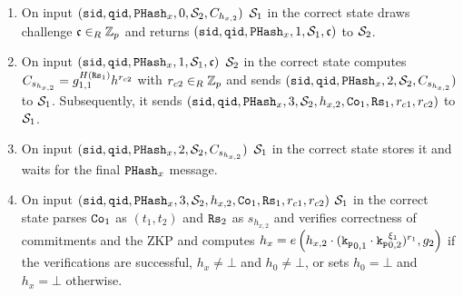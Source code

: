 \begin{enumerate}
    
	    \item On input $(\mathtt{sid},\mathtt{qid},\mathtt{PHash}_x,0,\mathcal{S}_2,C_{h_{x,2}})$ $\mathcal{S}_1$ in the correct state draws challenge $\mathfrak{c}\in_R\mathbb{Z}_p$ and returns $(\mathtt{sid},\mathtt{qid},\mathtt{PHash}_x,1,\mathcal{S}_1,\mathfrak{c})$ to $\mathcal{S}_2$.
	    
	    \item On input $(\mathtt{sid},\mathtt{qid},\mathtt{PHash}_x,1,\mathcal{S}_1,\mathfrak{c})$ $\mathcal{S}_2$ in the correct state computes
	    $C_{s_{h_{x,2}}}=g_{1,1}^{H(\mathtt{Rs}_{1})} h^{r_{c2}}$ with $r_{c2}\in_R\mathbb{Z}_p$
	    and sends $(\mathtt{sid},\mathtt{qid},\mathtt{PHash}_x,2,\mathcal{S}_2,C_{s_{h_{x,2}}})$ to $\mathcal{S}_1$.
	    Subsequently, it sends $(\mathtt{sid},\mathtt{qid},\mathtt{PHash}_x,3,\mathcal{S}_2,h_{x,2}, \mathtt{Co}_1, \mathtt{Rs}_1, r_{c1}, r_{c2})$ to $\mathcal{S}_1$.
	    
	    \item On input $(\mathtt{sid},\mathtt{qid},\mathtt{PHash}_x,2,\mathcal{S}_2,C_{s_{h_{x,2}}})$ $\mathcal{S}_1$ in the correct state stores it and waits for the final $\mathtt{PHash}_x$ message.
	    
	    \item On input $(\mathtt{sid},\mathtt{qid},\mathtt{PHash}_x,3,\mathcal{S}_2,h_{x,2}, \mathtt{Co}_1, \mathtt{Rs}_1, r_{c1}, r_{c2})$ $\mathcal{S}_1$ in the correct state parses $\mathtt{Co}_1$ as $(t_1,t_2)$ and $\mathtt{Rs}_2$ as $s_{h_{x,2}}$ and verifies correctness of commitments and the \ac{ZKP}
	     and computes
 	    $h_x = e\left( h_{x,2}\cdot (\mathtt{k_p}_{0,1} \cdot \mathtt{k_p}_{0,2}^{\xi_1})^{r_1}, g_2 \right)$
 	    if the verifications are successful, $h_x\not=\bot$ and $h_0\not=\bot$, or sets $h_0=\bot$ and $h_x=\bot$ otherwise.
	    
	    

\end{enumerate}
